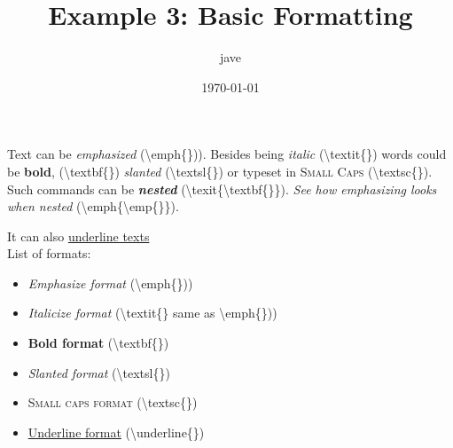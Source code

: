 \documentclass[letterpaper, 12pt]{article}
\begin{document}
\title{Example 3: Basic Formatting}
\author{jave}
\date{\today}
\maketitle


\newcommand{\emphEx}{\textbackslash{}emph\{\})}
\newcommand{\textitEx}{\textbackslash{}textit\{\}}
\newcommand{\textbfEx}{\textbackslash{}textbf\{\}}
\newcommand{\textslEx}{\textbackslash{}textsl\{\}}
\newcommand{\textscEx}{\textbackslash{}textsc\{\}}
\newcommand{\underlineEx}{\textbackslash{}underline\{\}}

Text can be \emph{emphasized} (\emphEx).
Besides being \textit{italic} (\textitEx) words could be \textbf{bold}, (\textbfEx)
\textsl{slanted} (\textslEx) or typeset in \textsc{Small Caps} (\textscEx).
Such commands can be \textit{\textbf{nested}} (\textbackslash{}texit\{\textbackslash{}textbf\{\}\}).
\emph{See how \emph{emphasizing} looks when nested} (\textbackslash{}emph\{\textbackslash{}emp\{\}\}).

It can also \underline{underline texts}\\

List of formats:
\begin{itemize}
    \item \emph{Emphasize format} (\emphEx)
    \item \textit{Italicize format} (\textitEx{} same as \emphEx)
    \item \textbf{Bold format} (\textbfEx)
    \item \textsl{Slanted format} (\textslEx)
    \item \textsc{Small caps format} (\textscEx)
    \item \underline{Underline format} (\underlineEx)
\end{itemize}
\end{document}
